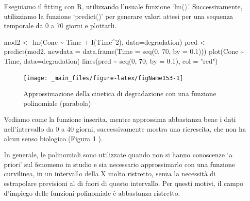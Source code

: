 \documentclass[a4paper,12pt,oneside]{book}
\newenvironment{Shaded}{\begin{snugshade}}{\end{snugshade}}
\newcommand{\DecValTok}[1]{#1}
\newcommand{\FloatTok}[1]{#1}
\newcommand{\SpecialCharTok}[1]{#1}
\newcommand{\StringTok}[1]{#1}
\newcommand{\OtherTok}[1]{#1}
\newcommand{\FunctionTok}[1]{#1}
\newcommand{\AttributeTok}[1]{#1}
\newcommand{\NormalTok}[1]{#1}
\begin{document}
Eseguiamo il fitting con R, utilizzando l'usuale funzione `lm().' Successivamente, utilizziamo la funzione `predict()' per generare valori attesi per una sequenza temporale da 0 a 70 giorni e plottarli.

\begin{Shaded}
\begin{Highlighting}[]
\NormalTok{mod2 }\OtherTok{\textless{}{-}} \FunctionTok{lm}\NormalTok{(Conc }\SpecialCharTok{\textasciitilde{}}\NormalTok{ Time }\SpecialCharTok{+} \FunctionTok{I}\NormalTok{(Time}\SpecialCharTok{\^{}}\DecValTok{2}\NormalTok{), }\AttributeTok{data=}\NormalTok{degradation)}
\NormalTok{pred }\OtherTok{\textless{}{-}} \FunctionTok{predict}\NormalTok{(mod2, }\AttributeTok{newdata =} \FunctionTok{data.frame}\NormalTok{(}\AttributeTok{Time =} \FunctionTok{seq}\NormalTok{(}\DecValTok{0}\NormalTok{, }\DecValTok{70}\NormalTok{, }\AttributeTok{by =} \FloatTok{0.1}\NormalTok{)))}
\FunctionTok{plot}\NormalTok{(Conc }\SpecialCharTok{\textasciitilde{}}\NormalTok{ Time, }\AttributeTok{data=}\NormalTok{degradation)}
\FunctionTok{lines}\NormalTok{(pred }\SpecialCharTok{\textasciitilde{}} \FunctionTok{seq}\NormalTok{(}\DecValTok{0}\NormalTok{, }\DecValTok{70}\NormalTok{, }\AttributeTok{by =} \FloatTok{0.1}\NormalTok{), }\AttributeTok{col =} \StringTok{"red"}\NormalTok{)}
\end{Highlighting}
\end{Shaded}

\begin{figure}

{\centering \texttt{[image: \_main\_files/figure-latex/figName153-1]} 

}

\caption{Approssimazione della cinetica di degradazione con una funzione polinomiale (parabola)}\label{fig:figName153}
\end{figure}

Vediamo come la funzione inserita, mentre approssima abbastanza bene i dati nell'intervallo da 0 a 40 giorni, successivamente mostra una ricrescita, che non ha alcun senso biologico (Figura \ref{fig:figName153} ).

In generale, le polinomiali sono utilizzate quando non si hanno conoscenze `a priori' sul fenomeno in studio e sia necessario approssimarlo con una funzione curvilinea, in un intervallo della X molto ristretto, senza la necessità di estrapolare previsioni al di fuori di questo intervallo. Per questi motivi, il campo d'impiego delle funzioni polinomiale è abbastanza ristretto.
\end{document}
